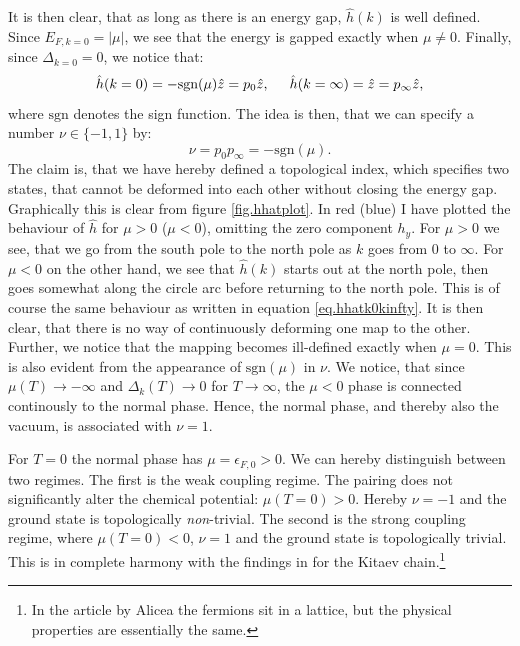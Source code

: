 It is then clear, that as long as there is an energy gap, $\hat{h}(k)$ is well defined. Since $E_{F,k=0} = |\mu|$, we see that the energy is gapped exactly when $\mu \neq 0$. Finally, since $\Delta_{k=0} = 0$, we notice that: 
\begin{equation}
\hat{h}(k=0) = -\text{sgn}(\mu)\hat{z} = p_0\hat{z}, \hspace{0.5cm} \hat{h}(k=\infty) = \hat{z} = p_{\infty}\hat{z},
\label{eq.hhatk0kinfty}
\end{equation}
where $\text{sgn}$ denotes the sign function. The idea is then, that we can specify a number $\nu \in \{-1,1\}$ by:
\begin{equation}
\nu = p_0p_{\infty} = -\text{sgn}(\mu).
\label{eq.topinvnudefition}
\end{equation}
The claim is, that we have hereby defined a topological index, which specifies two states, that cannot be deformed into each other without closing the energy gap. Graphically this is clear from figure \ref{fig.hhatplot}. In red (blue) I have plotted the behaviour of $\hat{h}$ for $\mu > 0$ ($\mu < 0$), omitting the zero component $h_y$. For $\mu > 0$ we see, that we go from the south pole to the north pole as $k$ goes from $0$ to $\infty$. For $\mu < 0$ on the other hand, we see that $\hat{h}(k)$ starts out at the north pole, then goes somewhat along the circle arc before returning to the north pole. This is of course the same behaviour as written in equation \eqref{eq.hhatk0kinfty}. It is then clear, that there is no way of continuously deforming one map to the other. Further, we notice that the mapping becomes ill-defined exactly when $\mu = 0$. This is also evident from the appearance of $\text{sgn}(\mu)$ in $\nu$. We notice, that since $\mu(T) \to -\infty$ and $\Delta_k(T)\to 0$ for $T\to \infty$, the $\mu < 0$ phase is connected continously to the normal phase. Hence, the normal phase, and thereby also the vacuum, is associated with $\nu = 1$. 

For $T = 0$ the normal phase has $\mu = \epsilon_{F,0} > 0$. We can hereby distinguish between two regimes. The first is the weak coupling regime. The pairing does not significantly alter the chemical potential: $\mu(T=0) > 0$. Hereby $\nu = -1$ and the ground state is topologically \textit{non}-trivial. The second is the strong coupling regime, where $\mu(T = 0) < 0$, $\nu = 1$ and the ground state is topologically trivial. This is in complete harmony with the findings in \cite{Alicea} for the Kitaev chain.\footnote{In the article by Alicea the fermions sit in a lattice, but the physical properties are essentially the same.}

